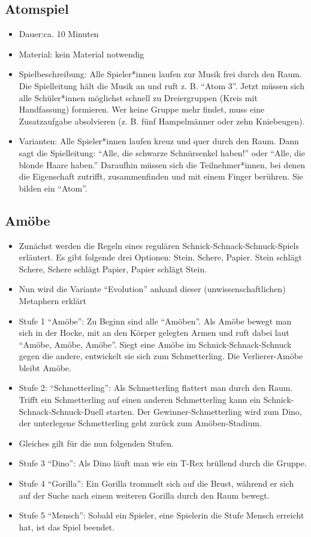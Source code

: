 \documentclass[a4paper, 11pt]{article}
\begin{document}
\subsection{Atomspiel}
\begin{itemize}
    \item Dauer:ca. 10 Minuten
    \item Material: kein Material notwendig
    \item Spielbeschreibung: Alle Spieler*innen laufen zur Musik frei durch den Raum. Die Spielleitung hält die Musik an und ruft z. B. ``Atom 3''. Jetzt müssen sich alle Schüler*innen möglichst schnell zu Dreiergruppen (Kreis mit Handfassung) formieren. Wer keine Gruppe mehr findet, muss eine Zusatzaufgabe absolvieren (z. B. fünf Hampelmänner oder zehn Kniebeugen). 
    \item Varianten: Alle Spieler*innen laufen kreuz und quer durch den Raum. Dann sagt die Spielleitung: ``Alle, die schwarze Schnürsenkel haben!'' oder ``Alle, die blonde Haare haben.'' Daraufhin müssen sich die Teilnehmer*innen, bei denen die Eigenschaft zutrifft, zusammenfinden und mit einem Finger berühren. Sie bilden ein ``Atom''.
\end{itemize}

\subsection{Amöbe}

\begin{itemize}
    \item Zunächst werden die Regeln eines regulären Schnick-Schnack-Schnuck-Spiels erläutert. Es gibt folgende drei Optionen: Stein, Schere, Papier. Stein schlägt Schere, Schere schlägt Papier, Papier schlägt Stein.
    \item Nun wird die Variante ``Evolution'' anhand dieser (unwissenschaftlichen) Metaphern erklärt 
    \item Stufe 1 ``Amöbe'': Zu Beginn sind alle ``Amöben''. Als Amöbe bewegt man sich in der Hocke, mit an den Körper gelegten Armen und ruft dabei laut ``Amöbe, Amöbe, Amöbe''. Siegt eine Amöbe im Schnick-Schnack-Schnuck gegen die andere, entwickelt sie sich zum Schmetterling. Die Verlierer-Amöbe bleibt Amöbe.
    \item Stufe 2: ``Schmetterling'': Als Schmetterling flattert man durch den Raum. Trifft ein Schmetterling auf einen anderen Schmetterling kann ein Schnick-Schnack-Schnuck-Duell starten. Der Gewinner-Schmetterling wird zum Dino, der unterlegene Schmetterling geht zurück zum Amöben-Stadium.

    \item Gleiches gilt für die nun folgenden Stufen.

    \item Stufe 3 ``Dino'': Als Dino läuft man wie ein T-Rex brüllend durch die Gruppe.
    \item Stufe 4 ``Gorilla'': Ein Gorilla trommelt sich auf die Brust, während er sich auf der Suche nach einem weiteren Gorilla durch den Raum bewegt.
    \item Stufe 5 ``Mensch'': Sobald ein Spieler, eine Spielerin die Stufe Mensch erreicht hat, ist das Spiel beendet. 
\end{itemize}
\end{document}
